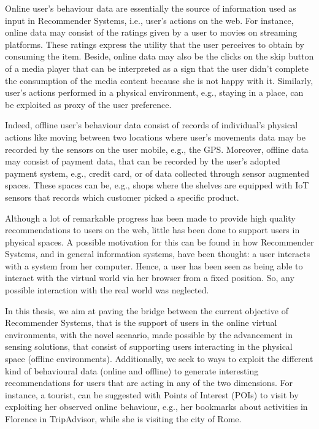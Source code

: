 Online user's behaviour data are essentially the source of information used as input in Recommender Systems, i.e., user's actions on the web. For instance, online data may consist of the ratings given by a user to movies on streaming platforms. These ratings express the utility that the user perceives to obtain by consuming the item. Beside, online data may also be the clicks on the skip button of a media player that can be interpreted as a sign that the user didn't complete the consumption of the media content because she is not happy with it. Similarly, user's actions performed in a physical environment, e.g., staying in a place, can be exploited as proxy of the user preference.

Indeed, offline user's behaviour data consist of records of individual's physical actions like moving between two locations where user's movements data may be recorded by the sensors on the user mobile, e.g., the GPS.
Moreover, offline data may consist of payment data, that can be recorded by the user's adopted payment system, e.g., credit card, or of data collected through sensor augmented spaces. These spaces can be, e.g., shops where the shelves are equipped with IoT sensors that records which customer picked a specific product.


Although a lot of remarkable progress has been made to provide high quality recommendations to users on the web, little has been done to support users in physical spaces. A possible motivation for this can be found in how Recommender Systems, and in general information systems, have been thought: a user interacts with a system from her computer. Hence, a user has been seen as being able to interact with the virtual world via her browser from a fixed position. So, any possible interaction with the real world was neglected.

% 


In this thesis, we aim at paving the bridge between the current objective of Recommender Systems, that is the support of users in the online virtual environments, with the novel scenario, made possible by the advancement in sensing solutions, that consist of supporting users interacting in the physical space (offline environments). Additionally, we seek to ways to exploit the different kind of behavioural data (online and offline) to generate interesting recommendations for users that are acting in any of the two dimensions. For instance, a tourist, can be suggested with Points of Interest (POIs) to visit by exploiting her observed online behaviour, e.g., her bookmarks about activities in Florence in TripAdvisor, while she is visiting the city of Rome.



